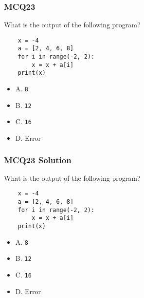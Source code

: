 \documentclass{beamer}
\begin{document}
\begin{frame}[fragile]
    \frametitle{MCQ23}
    What is the output of the following program?
    \begin{verbatim}
    x = -4
    a = [2, 4, 6, 8]
    for i in range(-2, 2):
        x = x + a[i]
    print(x)
    \end{verbatim}
    \begin{itemize}
        \item A. \texttt{8}
        \item B. \texttt{12}
        \item C. \texttt{16}
        \item D. Error
    \end{itemize}
\end{frame}
\begin{frame}[fragile]
    \frametitle{MCQ23 Solution}
    What is the output of the following program?
    \begin{verbatim}
    x = -4
    a = [2, 4, 6, 8]
    for i in range(-2, 2):
        x = x + a[i]
    print(x)
    \end{verbatim}
    \begin{itemize}
        \item A. \texttt{8}
        \item B. \texttt{12}
        \item \alert{C. \texttt{16}}
        \item D. Error
    \end{itemize}
\end{frame}
\end{document}
